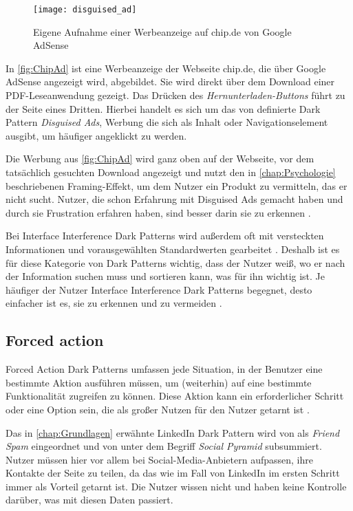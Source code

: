 \documentclass[conference,compsoc,final,a4paper]{IEEEtran}
\begin{document}
\begin{figure}[!ht]
  \centering
  \texttt{[image: disguised\_ad]}
  \caption{Eigene Aufnahme einer Werbeanzeige auf chip.de von Google AdSense~\autocite{ChipAd}}
  \label{fig:ChipAd}
\end{figure}

In \autoref{fig:ChipAd} ist eine Werbeanzeige der Webseite chip.de, die über Google AdSense angezeigt wird, abgebildet. Sie wird direkt über dem Download einer PDF-Leseanwendung gezeigt. Das Drücken des \textit{Hernunterladen-Buttons} führt zu der Seite eines Dritten. Hierbei handelt es sich um das von \citeauthor{Brignull} \autocite{Brignull} definierte Dark Pattern \textit{Disguised Ads}, Werbung die sich als Inhalt oder Navigationselement ausgibt, um häufiger angeklickt zu werden.

Die Werbung aus \autoref{fig:ChipAd} wird ganz oben auf der Webseite, vor dem tatsächlich gesuchten Download angezeigt und nutzt den in \autoref{chap:Psychologie} beschriebenen Framing-Effekt, um dem Nutzer ein Produkt zu vermitteln, das er nicht sucht. Nutzer, die schon Erfahrung mit Disguised Ads gemacht haben und durch sie Frustration erfahren haben, sind besser darin sie zu erkennen \autocite{M.Bhoot2020}.

Bei Interface Interference Dark Patterns wird außerdem oft mit versteckten Informationen und vorausgewählten Standardwerten gearbeitet \autocite{Gray_2018}. Deshalb ist es für diese Kategorie von Dark Patterns wichtig, dass der Nutzer weiß, wo er nach der Information suchen muss und sortieren kann, was für ihn wichtig ist. Je häufiger der Nutzer Interface Interference Dark Patterns begegnet, desto einfacher ist es, sie zu erkennen und zu vermeiden \autocite{M.Bhoot2020}.

\subsection{Forced action}
Forced Action Dark Patterns umfassen jede Situation, in der Benutzer eine bestimmte Aktion ausführen müssen, um (weiterhin) auf eine bestimmte Funktionalität zugreifen zu können. Diese Aktion kann ein erforderlicher Schritt oder eine Option sein, die als großer Nutzen für den Nutzer getarnt ist \autocite{Gray_2018}.

Das in \autoref{chap:Grundlagen} erwähnte LinkedIn Dark Pattern wird von \citeauthor{Brignull} \autocite{Brignull} als \textit{Friend Spam} eingeordnet und von \citeauthor*{Gray_2018} \autocite{Gray_2018} unter dem Begriff \textit{Social Pyramid} subsummiert. Nutzer müssen hier vor allem bei Social-Media-Anbietern aufpassen, ihre Kontakte der Seite zu teilen, da das wie im Fall von LinkedIn im ersten Schritt immer als Vorteil getarnt ist. Die Nutzer wissen nicht und haben keine Kontrolle darüber, was mit diesen Daten passiert.
\end{document}
